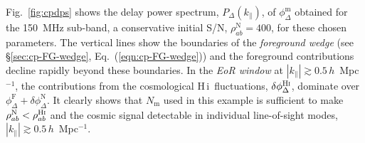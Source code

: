 \documentclass[
reprint,
superscriptaddress,
amsmath,
amssymb,
aps,
prd
]{revtex4-1}
\newcommand{\HI}{H\,{\sc i}}
\begin{document}
Fig.~\ref{fig:cpdps} shows the delay power spectrum, $P_\Delta(k_\parallel)$, of $\phi_\Delta^\textrm{m}$ obtained for the 150~MHz sub-band, a conservative initial S/N, $\rho_{ab}^\textrm{N}=400$, for these chosen parameters. The vertical lines show the boundaries of the {\it foreground wedge} (see \S\ref{sec:cp-FG-wedge}, Eq.~(\ref{eqn:cp-FG-wedge})) and the foreground contributions decline rapidly beyond these boundaries. In the {\it EoR window} at $|k_\parallel| \gtrsim 0.5\,h$~Mpc$^{-1}$, the contributions from the cosmological \HI\ fluctuations, $\delta\phi_\Delta^\textrm{H{\sc i}}$, dominate over $\phi_\Delta^\textrm{F} + \delta\phi_\Delta^\textrm{N}$. It clearly shows that $N_\textrm{m}$ used in this example is sufficient to make $\rho_{ab}^\textrm{N} < \rho_{ab}^\textrm{H{\sc i}}$ and the cosmic signal detectable in individual line-of-sight modes, $|k_\parallel| \gtrsim 0.5\,h$~Mpc$^{-1}$. 
\end{document}
